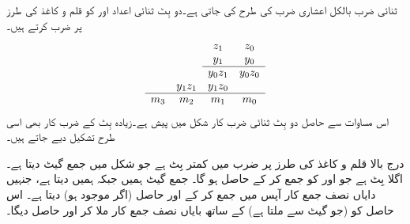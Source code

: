 ثنائی ضرب بالکل اعشاری ضرب  کی طرح کی جاتی ہے۔دو بِٹ   ثنائی اعداد   اور   کو قلم و کاغذ کی طرز پر    ضرب  کرتے ہیں۔
\begin{align*}
\begin{array}{cccc}
&& z_1&z_0\\
&& y_1&y_0\\
\cline{3-4}
&& y_0z_1&y_0z_0\\
&y_1z_1&y_1z_0&\\
\cline{1-4}
m_3&m_2&m_1&m_0
\end{array}
\end{align*}
اس مساوات سے حاصل دو بِٹ ثنائی   ضرب کار  شکل    میں    پیش ہے۔زیادہ بِٹ کے ضرب کار بھی اسی طرح تشکیل دیے  جاتے ہیں۔

  درج بالا قلم و کاغذ کی طرز پر   ضرب میں کمتر بِٹ  ہے جو شکل میں  جمع گیٹ    دیتا ہے۔ اگلا بِٹ  ہے جو  اور  کو جمع کر کے حاصل ہو گا۔ جمع گیٹ  ہمیں  جبکہ  ہمیں  دیتا ہے، جنہیں دایاں  نصف جمع کار   آپس میں جمع کر کے   اور حاصل (اگر موجود ہو) دیتا ہے۔ اس حاصل کو  (جو  گیٹ  سے ملتا ہے) کے ساتھ بایاں نصف جمع  کار   ملا کر  اور حاصل  دیگا۔ 
